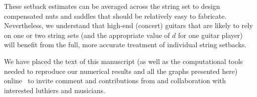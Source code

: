 These setback estimates can be averaged across the string set to design compensated nuts and saddles that should be relatively easy to fabricate. Nevertheless, we understand that high-end (concert) guitars that are likely to rely on one or two string sets (and the appropriate value of $d$ for one guitar player) will benefit from the full, more accurate treatment of individual string setbacks.


We have placed the text of this manuscript (as well as the computational tools needed to reproduce our numerical results and all the graphs presented here) online~\cite{ref:github2024rgb} to invite comment and contributions from and collaboration with interested luthiers and musicians.